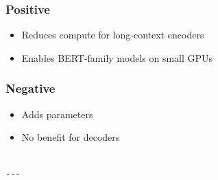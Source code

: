 \subsubsection{Positive}
\begin{itemize}
\item Reduces compute for long-context encoders
\item Enables BERT-family models on small GPUs

\end{itemize}
\subsubsection{Negative}
\begin{itemize}
\item Adds parameters
\item No benefit for decoders
\end{itemize}
\begin{lstlisting}

---
\end{lstlisting}
